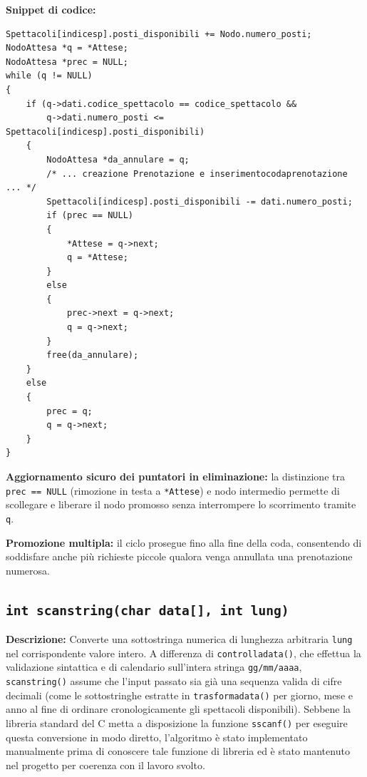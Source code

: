 \documentclass[11pt,a4paper,oneside,openany]{book}
\newenvironment{listacomp}{%
    \small
    \begin{list}{\textendash}{%
        \setlength{\topsep}{2pt}%
        \setlength{\partopsep}{0pt}%
        \setlength{\itemsep}{1pt}%
        \setlength{\parsep}{0pt}%
        \setlength{\leftmargin}{1.2em}%
    }%
}{%
    \end{list}%
}
\begin{document}
\begin{samepage}
\noindent\textbf{Snippet di codice:}
\begin{lstlisting}[caption={Ripristino posti e promozione FIFO dalla lista d'attesa in converteprenotazione()}]
Spettacoli[indicesp].posti_disponibili += Nodo.numero_posti;
NodoAttesa *q = *Attese;
NodoAttesa *prec = NULL;
while (q != NULL)
{
    if (q->dati.codice_spettacolo == codice_spettacolo &&
        q->dati.numero_posti <= Spettacoli[indicesp].posti_disponibili)
    {
        NodoAttesa *da_annulare = q;
        /* ... creazione Prenotazione e inserimentocodaprenotazione ... */
        Spettacoli[indicesp].posti_disponibili -= dati.numero_posti;
        if (prec == NULL)
        {
            *Attese = q->next;
            q = *Attese;
        }
        else
        {
            prec->next = q->next;
            q = q->next;
        }
        free(da_annulare);
    }
    else
    {
        prec = q;
        q = q->next;
    }
}
\end{lstlisting}

\begin{listacomp}
    \item \textbf{Aggiornamento sicuro dei puntatori in eliminazione:} la distinzione tra \texttt{prec == NULL} (rimozione in testa a \texttt{*Attese}) e nodo intermedio permette di scollegare e liberare il nodo promosso senza interrompere lo scorrimento tramite \texttt{q}.
    \item \textbf{Promozione multipla:} il ciclo prosegue fino alla fine della coda, consentendo di soddisfare anche più richieste piccole qualora venga annullata una prenotazione numerosa.
\end{listacomp}
\end{samepage}

\subsection[scanstring()]{\texttt{int scanstring(char data[], int lung)}}\label{sec:scanstring}

\noindent\textbf{Descrizione:}
Converte una sottostringa numerica di lunghezza arbitraria \texttt{lung} nel corrispondente valore intero. A differenza di \texttt{controlladata()}, che effettua la validazione sintattica e di calendario sull'intera stringa \texttt{gg/mm/aaaa}, \texttt{scanstring()} assume che l'input passato sia già una sequenza valida di cifre decimali (come le sottostringhe estratte in \texttt{trasformadata()} per giorno, mese e anno al fine di ordinare cronologicamente gli spettacoli disponibili). Sebbene la libreria standard del C metta a disposizione la funzione \texttt{sscanf()} per eseguire questa conversione in modo diretto, l'algoritmo è stato implementato manualmente prima di conoscere tale funzione di libreria ed è stato mantenuto nel progetto per coerenza con il lavoro svolto.
\end{document}

